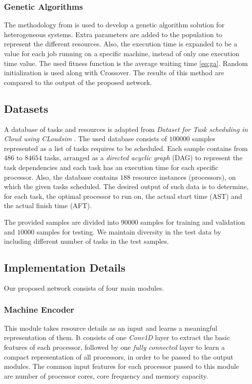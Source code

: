 \subsubsection{Genetic Algorithms}
The methodology from \cite{article2} is used to develop a genetic algorithm solution for heterogeneous systems. Extra parameters are added to the population to represent the different resources. Also, the execution time is expanded to be a value for each job running on a specific machine, instead of only one execution time value. The used fitness function is the average waiting time \ref{eq:ga}. Random initialization is used along with Crossover. The results of this method are compared to the output of the proposed network.

\subsection{Datasets}
A database of tasks and resources is adapted from \emph{Dataset for Task scheduling in Cloud using CLoudsim} \cite{px5b-b729-20}. The used database consists of $100000$ samples represented as a list of tasks requires to be scheduled. Each sample contains from $486$ to $84654$ tasks, arranged as a \emph{directed acyclic graph} (DAG) to represent the task dependencies and each task has an execution time for each specific processor. Also, the database contains $188$ resource instances (processors), on which the given tasks scheduled. The desired output of such data is to determine, for each task, the optimal processor to run on, the actual start time (AST) and the actual finish time (AFT). 

The provided samples are divided into $90000$ samples for training and validation and $10000$  samples for testing. We maintain diversity in the test data by including different number of tasks in the test samples.

\subsection{Implementation Details}
Our proposed network consists of four main modules.

\subsubsection{Machine Encoder}
This module takes resource details as an input and learns a meaningful representation of them. It consists of one \emph{Conv1D} layer to extract the basic features of each processor, followed by one \emph{fully connected} layer to learn a compact representation of all processors, in order to be passed to the output modules. The common input features for each processor passed to this module are number of processor cores, core frequency and memory capacity. \\

